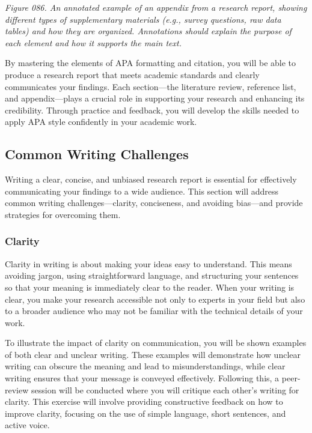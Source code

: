 \documentclass[
]{book}
\begin{document}
\emph{Figure 086. An annotated example of an appendix from a research report, showing different types of supplementary materials (e.g., survey questions, raw data tables) and how they are organized. Annotations should explain the purpose of each element and how it supports the main text.}

By mastering the elements of APA formatting and citation, you will be able to produce a research report that meets academic standards and clearly communicates your findings. Each section---the literature review, reference list, and appendix---plays a crucial role in supporting your research and enhancing its credibility. Through practice and feedback, you will develop the skills needed to apply APA style confidently in your academic work.

\subsection{Common Writing Challenges}\label{common-writing-challenges}

Writing a clear, concise, and unbiased research report is essential for effectively communicating your findings to a wide audience. This section will address common writing challenges---clarity, conciseness, and avoiding bias---and provide strategies for overcoming them.

\subsubsection{Clarity}\label{clarity}

Clarity in writing is about making your ideas easy to understand. This means avoiding jargon, using straightforward language, and structuring your sentences so that your meaning is immediately clear to the reader. When your writing is clear, you make your research accessible not only to experts in your field but also to a broader audience who may not be familiar with the technical details of your work.

To illustrate the impact of clarity on communication, you will be shown examples of both clear and unclear writing. These examples will demonstrate how unclear writing can obscure the meaning and lead to misunderstandings, while clear writing ensures that your message is conveyed effectively. Following this, a peer-review session will be conducted where you will critique each other's writing for clarity. This exercise will involve providing constructive feedback on how to improve clarity, focusing on the use of simple language, short sentences, and active voice.
\end{document}
